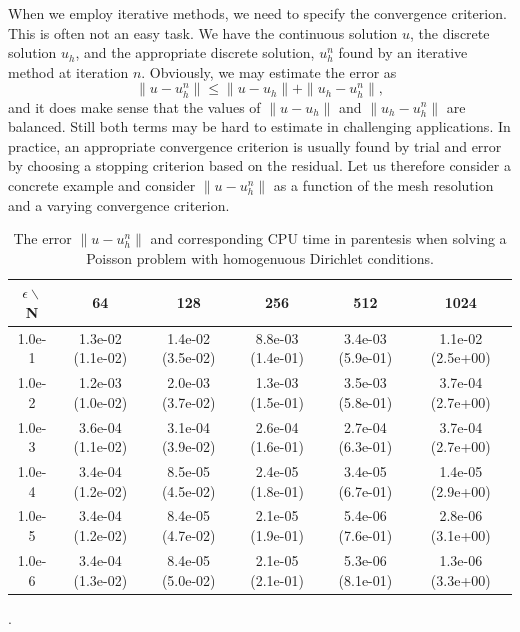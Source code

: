 When we employ iterative methods, we need to specify the convergence criterion. This is often 
not an easy task. We have the continuous solution $u$, the discrete solution $u_h$, and the
appropriate discrete solution, $u_h^n$ found by an iterative method at iteration $n$.  
Obviously, we may estimate the error as
\[
\|u-u^n_h\| \le \|u-u_h\| + \|u_h-u_h^n\|, 
\]
and it does make sense that the values of 
$\|u-u_h\|$ and $\|u_h-u_h^n\|$ are balanced. Still both terms may be hard to estimate in 
challenging applications. In practice, an appropriate convergence criterion is usually 
found by trial and error by choosing a stopping criterion based on the residual.   
Let us therefore consider a concrete example and consider $\|u-u^n_h\|$ 
as a function of the mesh resolution and a varying convergence criterion. 


\begin{table}
\begin{tabular}{c|ccccc}
\hline 
$\epsilon\backslash$ N & 64 & 128 & 256 & 512 & 1024 \\ \hline 
1.0e-1 &  1.3e-02 (1.1e-02) &  1.4e-02 (3.5e-02) &  8.8e-03 (1.4e-01) &  3.4e-03 (5.9e-01) &  1.1e-02 (2.5e+00) \\ 
1.0e-2 &  1.2e-03 (1.0e-02) &  2.0e-03 (3.7e-02) &  1.3e-03 (1.5e-01) &  3.5e-03 (5.8e-01) &  3.7e-04 (2.7e+00) \\ 
1.0e-3 &  3.6e-04 (1.1e-02) &  3.1e-04 (3.9e-02) &  2.6e-04 (1.6e-01) &  2.7e-04 (6.3e-01) &  3.7e-04 (2.7e+00) \\ 
1.0e-4 &  3.4e-04 (1.2e-02) &  8.5e-05 (4.5e-02) &  2.4e-05 (1.8e-01) &  3.4e-05 (6.7e-01) &  1.4e-05 (2.9e+00) \\ 
1.0e-5 &  3.4e-04 (1.2e-02) &  8.4e-05 (4.7e-02) &  2.1e-05 (1.9e-01) &  5.4e-06 (7.6e-01) &  2.8e-06 (3.1e+00) \\ 
1.0e-6 &  3.4e-04 (1.3e-02) &  8.4e-05 (5.0e-02) &  2.1e-05 (2.1e-01) &  5.3e-06 (8.1e-01) &  1.3e-06 (3.3e+00) \\ 
\end{tabular}
\caption{The error $\|u-u^n_h\|$ and corresponding CPU time in parentesis when solving a Poisson problem
with homogenuous Dirichlet conditions. } 
\label{conv:res:error}. 
\end{table}



